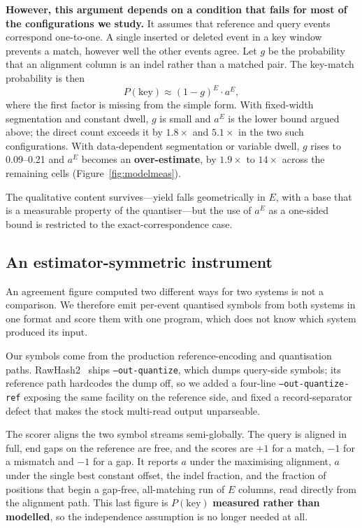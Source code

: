 \documentclass[runningheads]{llncs}
\begin{document}
\textbf{However, this argument depends on a condition that fails for most of the configurations
we study.} It assumes that reference and query events correspond one-to-one. A single inserted
or deleted event in a key window prevents a match, however well the other events agree. Let $g$
be the probability that an alignment column is an indel rather than a matched pair. The
key-match probability is then
\begin{equation}
P(\mathrm{key}) \approx (1-g)^{E} \cdot a^{E},
\label{eq:pkey}
\end{equation}
where the first factor is missing from the simple form. With fixed-width segmentation and
constant dwell, $g$ is small and $a^{E}$ is the lower bound argued above; the direct count
exceeds it by $1.8\times$ and $5.1\times$ in the two such configurations. With data-dependent
segmentation or variable dwell, $g$ rises to 0.09--0.21 and $a^{E}$ becomes an
\textbf{over-estimate}, by $1.9\times$ to $14\times$ across the remaining cells
(Figure~\ref{fig:modelmeas}).

The qualitative content survives---yield falls geometrically in $E$, with a base that is a
measurable property of the quantiser---but the use of $a^{E}$ as a one-sided bound is restricted
to the exact-correspondence case.

\subsection{An estimator-symmetric instrument}

An agreement figure computed two different ways for two systems is not a comparison. We
therefore emit per-event quantised symbols from both systems in one format and score them with
one program, which does not know which system produced its input.

Our symbols come from the production reference-encoding and quantisation paths.
RawHash2~\cite{rawhash2} ships
\texttt{--out-quantize}, which dumps query-side symbols; its reference path hardcodes the dump
off, so we added a four-line \texttt{--out-quantize-ref} exposing the same facility on the
reference side, and fixed a record-separator defect that makes the stock multi-read output
unparseable.

The scorer aligns the two symbol streams semi-globally. The query is aligned in full, end gaps
on the reference are free, and the scores are $+1$ for a match, $-1$ for a mismatch and $-1$
for a gap. It reports $a$ under the maximising alignment, $a$ under the single best constant
offset, the indel fraction, and the fraction of positions that begin a gap-free, all-matching
run of $E$ columns, read directly from the alignment path. This last figure is
$P(\mathrm{key})$ \textbf{measured rather than modelled}, so the independence assumption is no
longer needed at all.
\end{document}
